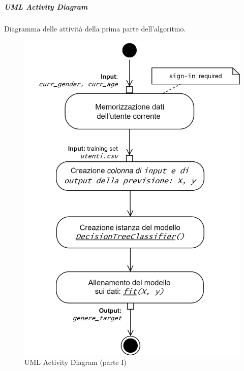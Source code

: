 \newpage


\subparagraph{UML Activity Diagram}
Diagramma delle attività della prima parte dell'algoritmo.
\begin{figure} [H]
    \centering
    \includegraphics[scale=1]{images/flowchart_1_UML.png}
    \caption{UML Activity Diagram (parte I)}
    \label{fig-uml-ac-1}
\end{figure}


\newpage
